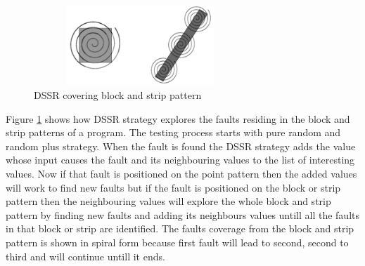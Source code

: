 \begin{figure}[htp]
\centering
\includegraphics[width=8cm,height=3cm]{figures/block2.png}
\caption{DSSR covering block and strip pattern}
\label{fig:block2}
\end{figure}

Figure \ref{fig:block2} shows how DSSR strategy explores the faults residing in the block and strip patterns of a program. The testing process starts with pure random and random plus strategy. When the fault is found the DSSR strategy adds the value whose input causes the fault and its neighbouring values to the list of interesting values. Now if that fault is positioned on the point pattern then the added values will work to find new faults but if the fault is positioned on the block or strip pattern then the neighbouring values will explore the whole block and strip pattern by finding new faults and adding its neighbours values untill all the faults in that block or strip are identified. The faults coverage from the block and strip pattern is shown in spiral form because first fault will lead to second, second to third and will continue untill it ends.\\


